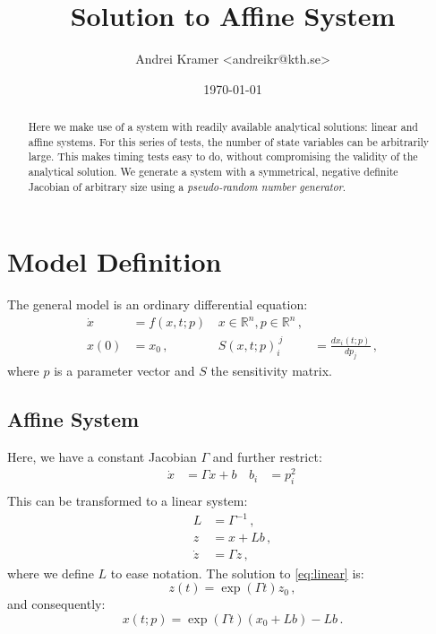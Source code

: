 \documentclass[utf8,english,DIV=12]{scrartcl}
\author{Andrei Kramer <andreikr@kth.se>}
\date{\today}
\title{Solution to Affine System}
\begin{document}
\maketitle
\begin{abstract}
  \noindent Here we make use of a system with readily available analytical
  solutions: linear and affine systems. For this series of tests, the
  number of state variables can be arbitrarily large. This makes
  timing tests easy to do, without compromising the validity of the
  analytical solution. We generate a system with a symmetrical, negative definite Jacobian of arbitrary size using a \emph{pseudo-random number generator}.
\end{abstract}

\section{Model Definition}
\label{sec:model}

The general model is an ordinary differential equation:
\begin{align}
  \dot x&=f(x,t;p)\, & x\in\mathbb{R}^n, p\in\mathbb{R}^n\,,\\
  x(0) &= x_0\,, & S(x,t;p)_i^{~j}&=\frac{dx_i(t;p)}{dp_j}\,,
\end{align}
where $p$ is a parameter vector and $S$ the sensitivity matrix. 

\subsection{Affine System}
\label{sec:affine}

Here, we have a constant Jacobian $\Gamma$ and further restrict:
\begin{align}
  \dot x&=\Gamma x + b\, & b_i&=p_i^2\,\label{eq:affine}\\
\end{align}
This can be transformed to a linear system:
\begin{equation}
  \begin{split}
  L&=\Gamma^{-1}\,,\\
  z&=x+L b\,,\\
  \dot z&=\Gamma z\,,
  \end{split}\label{eq:linear}
\end{equation}
where we define $L$ to ease notation. The solution to \eqref{eq:linear} is:
\begin{equation}
  z(t) = \exp\left(\Gamma t\right) z_0\,,
\end{equation}
and consequently:
\begin{equation}
  x(t;p) = \exp\left(\Gamma t\right) (x_0 + Lb) - Lb \,.\label{eq:sol}
\end{equation}
\end{document}
